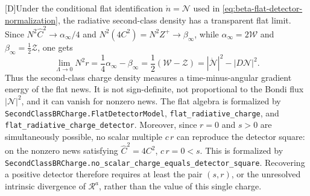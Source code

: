 \documentclass[11pt,a4paper]{article}
\newcommand{\cR}{\mathcal{R}}
\newcommand{\statusD}{\textsf{[D]}}
\begin{document}
\statusD Under the conditional flat identification \(\mathring n=\mathcal N\) used in \eqref{eq:beta-flat-detector-normalization}, the radiative second-class density has a transparent flat limit.  Since \(N^2\hat C^2\to\alpha_\infty/4\) and \(N^2(4C^2)=N^2Z^+\to\beta_\infty\), while \(\alpha_\infty=2\mathcal W\) and \(\beta_\infty=\tfrac12\mathcal Z\), one gets
\begin{equation}\label{eq:BR-flat-radiative-density}
  \lim_{\Lambda\to0}N^2 r
  =
  \frac14\alpha_\infty-\beta_\infty
  =
  \frac12(\mathcal W-\mathcal Z)
  =
  |\dot{\mathcal N}|^2-|D\mathcal N|^2 .
\end{equation}
Thus the second-class charge density measures a time-minus-angular gradient energy of the flat news.  It is not sign-definite, not proportional to the Bondi flux \(|\mathcal N|^2\), and it can vanish for nonzero news.  The flat algebra is formalized by \texttt{SecondClassBRCharge.FlatDetectorModel}, \texttt{flat\_radiative\_charge}, and \texttt{flat\_radiative\_charge\_detector}.  Moreover, since \(r=0\) and \(s>0\) are simultaneously possible, no scalar multiple \(c\,r\) can reproduce the detector square: on the nonzero news satisfying \(\hat C^2=4C^2\), \(c\,r=0<s\).  This is formalized by \texttt{SecondClassBRCharge.no\_scalar\_charge\_equals\_detector\_square}.  Recovering a positive detector therefore requires at least the pair \((s,r)\), or the unresolved intrinsic divergence of \(\cR^a\), rather than the value of this single charge.
\end{document}
